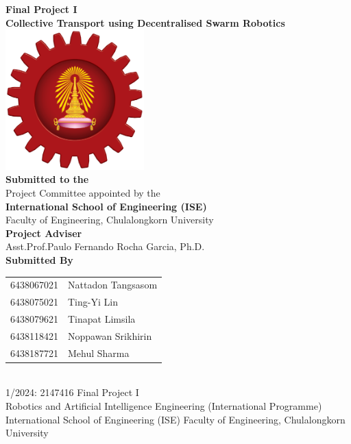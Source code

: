 \begin{titlepage}
    \centering

    {\LARGE \textbf{Final Project I}}\\[1cm]
    {\Huge \textbf{Collective Transport using Decentralised Swarm Robotics}}\\[1cm]

    \includegraphics[width=0.4\textwidth]{assets/images/ise_logo.png}\\[1cm]
    
    \textbf{Submitted to the}\\[0.1cm]
    Project Committee appointed by the\\
    \textbf{International School of Engineering (ISE)}\\
    Faculty of Engineering, Chulalongkorn University\\[1cm]

    \textbf{Project Adviser}\\[0.1cm]
    Asst.Prof.Paulo Fernando Rocha Garcia, Ph.D.\\[1cm]

    \textbf{Submitted By}\\[0.5cm]
    \begin{tabular}{rl}
        6438067021 & Nattadon Tangsasom \\
        6438075021 & Ting-Yi Lin \\
        6438079621 & Tinapat Limsila \\
        6438118421 & Noppawan Srikhirin \\
        6438187721 & Mehul Sharma \\
    \end{tabular}\\[1cm]
    1/2024: 2147416 Final Project I\\
    Robotics and Artificial Intelligence Engineering (International Programme)\\
    International School of Engineering (ISE) Faculty of Engineering, Chulalongkorn University

\end{titlepage}
